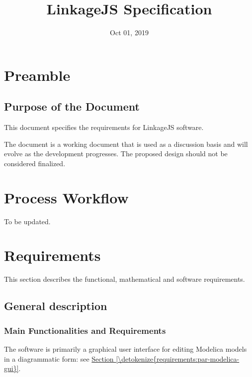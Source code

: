 \documentclass[letterpaper,10pt, openany,english]{sphinxmanual}
\title{LinkageJS Specification}
\date{Oct 01, 2019}
\author{}
\begin{document}
\pagestyle{empty}
\sphinxmaketitle
\pagestyle{plain}
\sphinxtableofcontents
\pagestyle{normal}
\label{\detokenize{index::doc}}


\pagestyle{plain}


\chapter{Preamble}
\label{\detokenize{preamble:preamble}}\label{\detokenize{preamble::doc}}

\section{Purpose of the Document}
\label{\detokenize{preamble:purpose-of-the-document}}
This document specifies the requirements for LinkageJS software.

The document is a working document that is used as a discussion basis and will evolve as the development progresses.
The proposed design should not be considered finalized.


\chapter{Process Workflow}
\label{\detokenize{process:process-workflow}}\label{\detokenize{process:sec-process}}\label{\detokenize{process::doc}}
To be updated.


\chapter{Requirements}
\label{\detokenize{requirements:requirements}}\label{\detokenize{requirements:sec-requirements}}\label{\detokenize{requirements::doc}}
This section describes the functional, mathematical and software requirements.


\section{General description}
\label{\detokenize{requirements:general-description}}\label{\detokenize{requirements:par-general-description}}

\subsection{Main Functionalities and Requirements}
\label{\detokenize{requirements:main-functionalities-and-requirements}}
The software is primarily a graphical user interface for editing Modelica models in a diagrammatic form: see \hyperref[\detokenize{requirements:par-modelica-gui}]{Section \ref{\detokenize{requirements:par-modelica-gui}}}.
\end{document}
